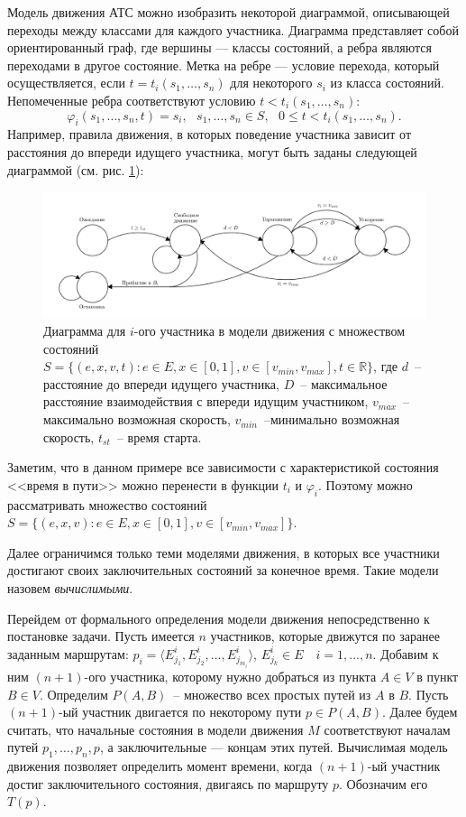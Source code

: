 \documentclass[12pt, a4paper]{article}
\begin{document}
	Модель движения АТС можно изобразить некоторой диаграммой, описывающей переходы между классами для каждого участника. Диаграмма представляет собой ориентированный граф, где вершины --- классы состояний, а ребра являются переходами в другое состояние. Метка на ребре --- условие перехода, который осуществляется, если $t =  t_i(s_1, \dots, s_n)$ для некоторого $s_i$ из класса состояний. Непомеченные ребра соответствуют условию $t < t_i(s_1, \dots, s_n)$:
	$$\varphi_i (s_1, \dots, s_n, t) = s_i, \text{ } s_1, \dots, s_n \in S, \text{ } 0 \le t < t_i(s_1, \dots, s_n).$$
	Например, правила движения, в которых поведение участника зависит от расстояния до впереди идущего участника, могут быть заданы следующей диаграммой (см. рис. \ref{ris:example_diag}):
	\begin{figure}[H]
		\centering
		\includegraphics[scale=0.25]{example-gen.png}
		\caption{Диаграмма для $i$-ого участника в модели движения с множеством состояний $S = \{(e, x, v, t): e \in E, x \in [0, 1], v \in [v_{min}, v_{max}], t \in \mathbb{R}\}$, где $d$~-- расстояние до впереди идущего участника, $D$~-- максимальное расстояние взаимодействия с впереди идущим участником, $v_{max}$~--максимально возможная скорость, $v_{min}$~--минимально возможная скорость, $t_{st}$~-- время старта.}
		\label{ris:example_diag}
	\end{figure}
	
	Заметим, что в данном примере все зависимости с характеристикой состояния <<время в пути>> можно перенести в функции $t_i$ и $\varphi_i$. Поэтому можно рассматривать множество состояний $S = \{(e, x, v): e \in E, x \in [0, 1], v \in [v_{min}, v_{max}]\}$.
	
	Далее ограничимся только теми моделями движения, в которых все участники достигают своих заключительных состояний за конечное время. Такие модели назовем \textit{вычислимыми}.
	
	Перейдем от формального определения модели движения непосредственно к постановке задачи.
	Пусть имеется $n$ участников, которые движутся по заранее заданным маршрутам:  $ p_i = \langle E^i_{j_1}, E^i_{j_2}, \dots, E^i_{j_{m_i}} \rangle$, $ E^i_{j_k} \in E \quad i = 1, \dots, n$. Добавим к ним $(n+1)$-ого участника, которому нужно добраться из пункта $A \in V$ в пункт $B \in V$. Определим $P(A,B)$~-- множество всех простых путей из $A$ в $B$. Пусть $(n+1)$-ый участник двигается по некоторому пути $p \in P(A, B)$.
	Далее будем считать, что начальные состояния в модели движения $M$ соответствуют началам путей $p_1, \dots, p_n, p$, а заключительные --- концам этих путей. Вычислимая модель движения позволяет определить момент времени, когда $(n+1)$-ый участник достиг заключительного состояния, двигаясь по маршруту $p$. Обозначим его $T(p)$.
	
\end{document}
